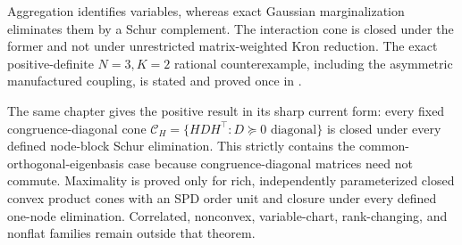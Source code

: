 Aggregation identifies variables, whereas exact Gaussian marginalization
eliminates them by a Schur complement. The interaction cone is closed under
the former and not under unrestricted matrix-weighted Kron reduction. The
exact positive-definite \(N=3,K=2\) rational counterexample, including the
asymmetric manufactured coupling, is stated and proved once in
. 

The same chapter gives the positive result in its sharp current form: every
fixed congruence-diagonal cone
\(\mathcal C_H=\{HDH^\top:D\succeq0\text{ diagonal}\}\) is closed under
every defined node-block Schur elimination. This strictly contains the
common-orthogonal-eigenbasis case because congruence-diagonal matrices need
not commute. Maximality is proved only for rich, independently parameterized
closed convex product cones with an SPD order unit and closure under every
defined one-node elimination. Correlated, nonconvex, variable-chart,
rank-changing, and nonflat families remain outside that theorem.
